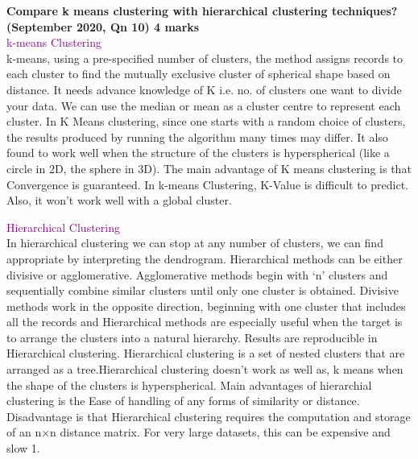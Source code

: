 
\textbf{\textcolor{LightMagenta}{Compare k means clustering with hierarchical clustering
techniques? (September 2020, Qn 10) \hfill 4 marks}} \\[5pt]
\textcolor{purple}{k-means Clustering} \\
k-means, using a pre-specified number of clusters, the method assigns records to each
cluster to find the mutually exclusive cluster of spherical shape based on distance. It
needs advance knowledge of K i.e. no. of clusters one want to divide your data. We can
use the median or mean as a cluster centre to represent each cluster. In K Means
clustering, since one starts with a random choice of clusters, the results produced by
running the algorithm many times may differ. It also found to work well when the
structure of the clusters is hyperspherical (like a circle in 2D, the sphere in 3D). The
main advantage of K means clustering is that Convergence is guaranteed. In k-means
Clustering, K-Value is difficult to predict. Also, it won’t work well with a global cluster.

\textcolor{purple}{Hierarchical Clustering}
\\
In hierarchical clustering we can stop at any number of clusters, we can find appropriate
by interpreting the dendrogram. Hierarchical methods can be either divisive or
agglomerative. Agglomerative methods begin with ‘n’ clusters and sequentially combine
similar clusters until only one cluster is obtained. Divisive methods work in the opposite
direction, beginning with one cluster that includes all the records and Hierarchical
methods are especially useful when the target is to arrange the clusters into a natural
hierarchy. Results are reproducible in Hierarchical clustering. Hierarchical clustering is a
set of nested clusters that are arranged as a tree.Hierarchical clustering doesn’t work as
well as, k means when the shape of the clusters is hyperspherical. Main advantages of
hierarchial clustering is the Ease of handling of any forms of similarity or distance.
Disadvantage is that Hierarchical clustering requires the computation and storage of an
n×n distance matrix. For very large datasets, this can be expensive and slow 1.